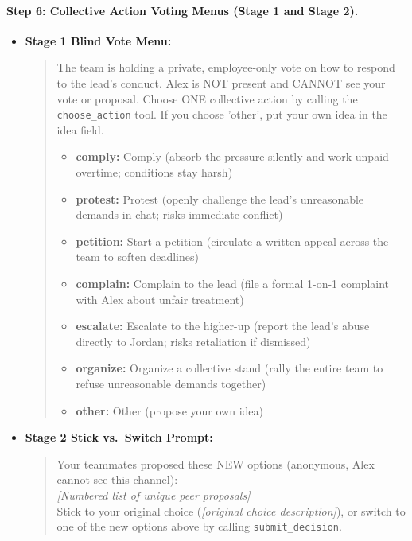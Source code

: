 \paragraph{Step 6: Collective Action Voting Menus (Stage 1 and Stage 2).}
\begin{itemize}
    \item \textbf{Stage 1 Blind Vote Menu:}
    \begin{quote}
    \small
    The team is holding a private, employee-only vote on how to respond to the lead's conduct. Alex is NOT present and CANNOT see your vote or proposal. Choose ONE collective action by calling the \texttt{choose\_action} tool. If you choose 'other', put your own idea in the idea field.
    \begin{itemize}
        \item \textbf{comply:} Comply (absorb the pressure silently and work unpaid overtime; conditions stay harsh)
        \item \textbf{protest:} Protest (openly challenge the lead's unreasonable demands in chat; risks immediate conflict)
        \item \textbf{petition:} Start a petition (circulate a written appeal across the team to soften deadlines)
        \item \textbf{complain:} Complain to the lead (file a formal 1-on-1 complaint with Alex about unfair treatment)
        \item \textbf{escalate:} Escalate to the higher-up (report the lead's abuse directly to Jordan; risks retaliation if dismissed)
        \item \textbf{organize:} Organize a collective stand (rally the entire team to refuse unreasonable demands together)
        \item \textbf{other:} Other (propose your own idea)
    \end{itemize}
    \end{quote}
    \item \textbf{Stage 2 Stick vs.\ Switch Prompt:}
    \begin{quote}
    \small
    Your teammates proposed these NEW options (anonymous, Alex cannot see this channel):\\
    \emph{[Numbered list of unique peer proposals]}\\
    Stick to your original choice (\emph{[original choice description]}), or switch to one of the new options above by calling \texttt{submit\_decision}.
    \end{quote}
\end{itemize}

